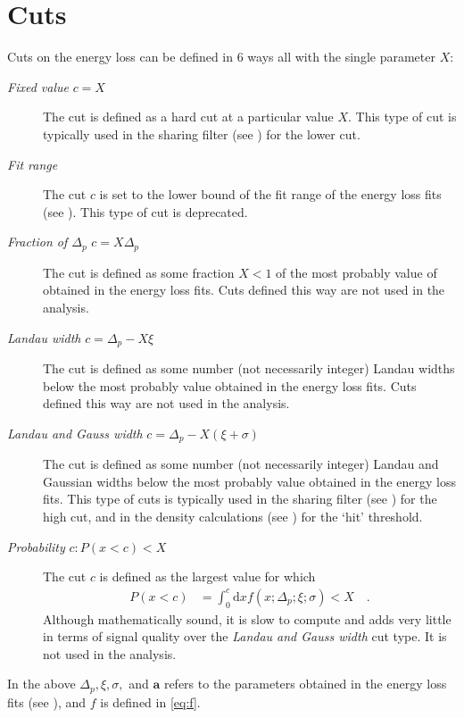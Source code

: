 \section{Cuts}
\label{sec:cuts}

Cuts on the energy loss can be defined in 6 ways all with the single
parameter $X$:
\begin{description}
\item[\emph{Fixed value} $c=X$]
  The cut is defined as a hard cut at a particular value $X$.  This
  type of cut is typically used in the sharing filter (see
  ) for the lower cut.
\item[\emph{Fit range}]
  The cut $c$ is set to the lower bound of the fit range of the energy
  loss fits (see ).  This type of cut is deprecated.
\item[\emph{Fraction of $\Delta_p$} $c=X\Delta_p$] The cut is defined
  as some fraction $X<1$ of the most probably value of obtained in
  the energy loss fits.  Cuts defined this way are not used in the
  analysis. 
\item[\emph{Landau width} $c=\Delta_p-X\xi$] The cut is defined as
  some number (not necessarily integer) Landau widths below the most
  probably value obtained in the energy loss fits. Cuts defined this
  way are not used in the analysis. 
\item[\emph{Landau and Gauss width} $c=\Delta_p - X(\xi+\sigma)$] The
  cut is defined as some number (not necessarily integer) Landau and
  Gaussian widths below the most probably value obtained in the energy
  loss fits. This type of cuts is typically used in the sharing filter
  (see ) for the high cut, and in the
  density calculations (see ) for
  the `hit' threshold.
\item[\emph{Probability} $c:P(x<c)<X$] The cut $c$ is defined as
  the largest value for which 
  \begin{align*}
    P(x<c) &= \int_0^c\text{d}x f(x;\Delta_p;\xi;\sigma) < X\quad.
  \end{align*}
  Although mathematically sound, it is slow to compute and adds very
  little in terms of signal quality over the \emph{Landau and Gauss
    width}  cut type.  It is not used in the analysis.
\end{description}
In the above $\Delta_p,\xi,\sigma,$ and $\mathbf{a}$ refers to the
parameters obtained in the energy loss fits (see ),
and $f$ is defined in \eqref{eq:f}.

